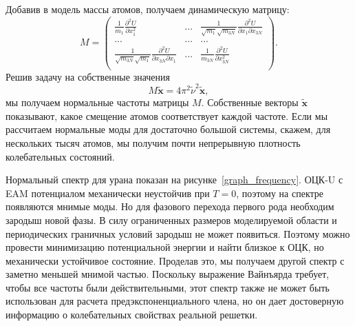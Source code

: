 \documentclass[master,14pt,subf,href,colorlinks=true
]{disser}
\begin{document}
\noindent Добавив в модель массы атомов, получаем динамическую матрицу:
\begin{equation}
M = \left( \begin{array}{ccc}
\frac{1}{m_1}\frac{\partial^2 U}{\partial x_1^2} & ... & \frac{1}{\sqrt{m_1}\sqrt{m_{3N}}}\frac{\partial^2 U}{\partial x_1 \partial x_{3N}} \\
... & ... & ... \\
\frac{1}{\sqrt{m_{3N}}\sqrt{m_1}}\frac{\partial^2 U}{\partial x_{3N} \partial x_1} & ... & \frac{1}{m_{3N}}\frac{\partial^2 U}{\partial x_{3N}^2}\\ 
\end{array} \right).
\end{equation}
Решив задачу на собственные значения
\begin{equation} \label{eigenproblem}
M \mathbf{\tilde{x}} = 4\pi^2\tilde{\nu}^2  \mathbf{\tilde{x}},
\end{equation}
мы получаем нормальные частоты матрицы $M$. Собственные векторы $\mathbf{\tilde{x}}$ показывают, какое смещение атомов соответствует каждой частоте. Если мы рассчитаем нормальные моды для достаточно большой системы, скажем, для нескольких тысяч атомов, мы получим почти непрерывную плотность колебательных состояний.

Нормальный спектр для урана показан на рисунке~\ref{graph_frequency}.
ОЦК-U с EAM потенциалом механически неустойчив при $T=0$, поэтому на спектре появляются мнимые моды. Но для фазового перехода первого рода необходим зародыш новой фазы. В силу ограниченных размеров моделируемой области и периодических граничных условий зародыш не может появиться. Поэтому можно провести минимизацию потенциальной энергии и найти близкое к ОЦК, но механически устойчивое состояние. Проделав это, мы получаем другой спектр с заметно меньшей мнимой частью. Поскольку выражение Вайнъярда требует, чтобы все частоты были действительными, этот спектр также не может быть использован для расчета предэкспоненциального члена, но он дает достоверную информацию о колебательных свойствах реальной решетки.
\end{document}
